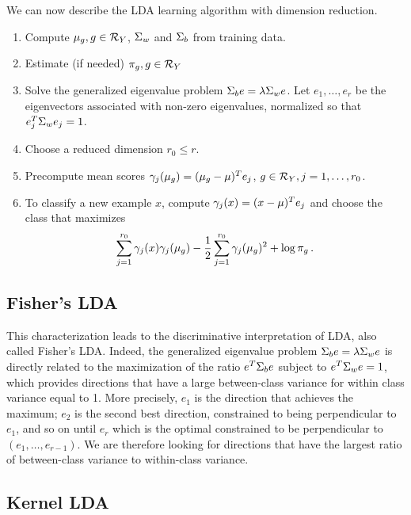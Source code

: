 We can now describe the LDA learning algorithm with dimension reduction.
\begin{algorithm}
\begin{enumerate}[label = \arabic*.,wide=0.5cm]
\item Compute $\mu_g, g\in {\mathcal R}_Y$, $\Sigma_w$ and $\Sigma_b$ from training data.
\item Estimate (if needed) $\pi_g, g\in {\mathcal R}_Y$
\item Solve the generalized eigenvalue problem $\Sigma_b e = \lambda\Sigma_w e$. Let $e_1, \ldots, e_r$ be the eigenvectors associated with non-zero eigenvalues, normalized so that  $e_j^T \Sigma_w e_j = 1$. 
\item Choose a reduced dimension $r_0 \leq r$.
\item Precompute mean scores $\gamma_j(\mu_g) = (\mu_g- \mu)^T e_j$, $g\in {\mathcal R}_Y, j=1, \ldots, r_0$.
\item To classify a new example $x$, compute $\gamma_j(x) = (x-\mu)^T e_j$ and choose the class that maximizes 
\[
\sum_{j=1}^{r_0}\gamma_j(x)\gamma_j(\mu_g) - \frac{1}{2} \sum_{j=1}^{r_0} \gamma_j(\mu_g)^2 + \log \pi_g\,.
\]
\end{enumerate}
\end{algorithm}


\subsection{Fisher's LDA}
This characterization  leads to the discriminative interpretation of LDA, also called Fisher's LDA. Indeed, the generalized eigenvalue problem $\Sigma_b e = \lambda \Sigma_w e$ is directly related to the maximization of the ratio
$e^T\Sigma_be$ subject to $e^T\Sigma_w e= 1$, which provides directions that have a large between-class variance for within class variance equal to 1. More precisely, $e_1$ is the direction that achieves the maximum; $e_2$ is the second best direction, constrained to being perpendicular to $e_1$, and so on until $e_r$ which is the optimal constrained to be perpendicular to $(e_1, \ldots, e_{r-1})$. We are therefore looking for directions that have the largest ratio of   between-class variance to  within-class variance. 

\subsection{Kernel LDA}

